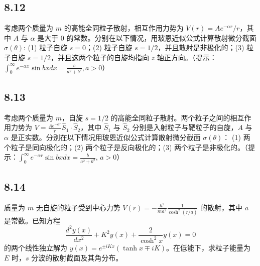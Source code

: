 \subsection{8.12}
考虑两个质量为 $m$ 的高能全同粒子散射，相互作用力势为 $V(r) = Ae^{-\alpha r}/r$，其中 $A$ 与 $\alpha$ 是大于 $0$ 的常数。分别在以下情况，用玻恩近似公式计算散射微分截面 $\sigma(\theta)$: (1) 粒子自旋 $s = 0$；(2) 粒子自旋 $s = 1/2$，并且散射是非极化的；(3) 粒子自旋 $s = 1/2$，并且这两个粒子的自旋均指向 $z$ 轴正方向。（提示：$\int_0^\infty e^{-\alpha x} \sin bx dx = \frac{b}{a^2 + b^2}, a > 0$）

\subsection{8.13}
考虑两个质量为 $m$，自旋 $s = 1/2$ 的高能全同粒子散射。两个粒子之间的相互作用力势为 $V = \frac{Ae^{-\alpha r}}{r} \hat{S}_1 \cdot \hat{S}_2$，其中 $\hat{S}_1$ 与 $\hat{S}_2$ 分别是入射粒子与靶粒子的自旋，$A$ 与 $\alpha$ 是正实数。分别在以下情况用玻恩近似公式计算散射微分截面 $\sigma(\theta)$：
(1) 两个粒子是同向极化的；(2) 两个粒子是反向极化的；(3) 两个粒子是非极化的。（提示：$\int_0^\infty e^{-\alpha r} \sin bx dx = \frac{b}{a^2 + b^2}$, $a > 0$）

\subsection{8.14}
质量为 $m$ 无自旋的粒子受到中心力势 $V(r) = -\frac{\hbar^2}{ma^2} \frac{1}{\cosh^2 (r/a)}$ 的散射，其中 $a$ 是常数。已知方程 
$$\frac{d^2 y(x)}{dx^2} + K^2 y(x) + \frac{2}{\cosh^2 x} y(x) = 0$$ 
的两个线性独立解为 $y(x) = e^{\pm iKx} (\tanh x \mp iK)$。在低能下，求粒子能量为 $E$ 时，$s$ 分波的散射截面及其角分布。